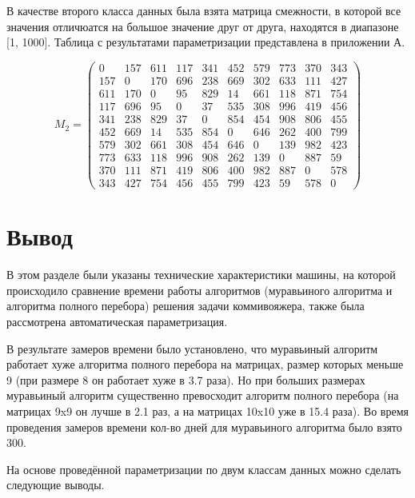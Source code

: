 В качестве второго класса данных была взята матрица смежности, в которой все значения отличюатся на большое значение друг от друга, находятся в диапазоне [1, 1000]. Таблица с результатами параметризации представлена в приложении А.

\begin{equation}
    \label{eq:kd2}
	M_{2} = \begin{pmatrix}
		0 & 157 & 611 & 117 & 341 & 452 & 579 & 773 & 370 & 343 \\
		157 & 0 & 170 & 696 & 238 & 669 & 302 & 633 & 111 & 427 \\
		611 & 170 & 0 & 95 & 829 & 14 & 661 & 118 & 871 & 754 \\
		117 & 696 & 95 & 0 & 37 & 535 & 308 & 996 & 419 & 456 \\
		341 & 238 & 829 & 37 & 0 & 854 & 454 & 908 & 806 & 455 \\
		452 & 669 & 14 & 535 & 854 & 0 & 646 & 262 & 400 & 799 \\
		579 & 302 & 661 & 308 & 454 & 646 & 0 & 139 & 982 & 423 \\
		773 & 633 & 118 & 996 & 908 & 262 & 139 & 0 & 887 & 59 \\
		370 & 111 & 871 & 419 & 806 & 400 & 982 & 887 & 0 & 578 \\
		343 & 427 & 754 & 456 & 455 & 799 & 423 & 59 & 578 & 0 
	\end{pmatrix}
\end{equation}


\section{Вывод}

В этом разделе были указаны технические характеристики машины, на которой происходило сравнение времени работы алгоритмов (муравьиного алгоритма и алгоритма полного перебора) решения задачи коммивояжера, также была рассмотрена автоматическая параметризация.

В результате замеров времени было установлено, что муравьиный алгоритм работает хуже алгоритма полного перебора на матрицах, размер которых меньше 9 (при размере 8 он работает хуже в 3.7 раза). Но при больших размерах муравьиный алгоритм существенно превосходит алгоритм полного перебора (на матрицах 9x9 он лучше в 2.1 раз, а на матрицах 10x10 уже в 15.4 раза). Во время проведения замеров времени кол-во дней для муравьиного алгоритма было взято 300.

На основе проведённой параметризации по двум классам данных можно сделать следующие выводы.

